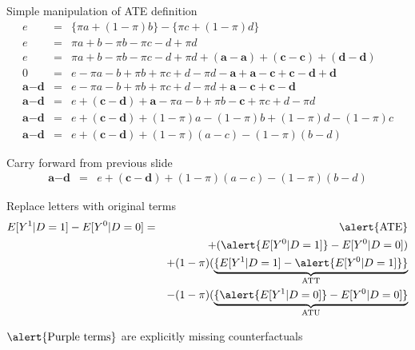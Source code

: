 \documentclass{beamer}
\begin{document}
\begin{frame}[plain]

  \begin{block}{Simple manipulation of ATE definition}
    \begin{eqnarray*}
      e&=&\{\pi{a} + (1-\pi)b\} - \{\pi{c} + (1-\pi)d\}  \\
      e&=&\pi{a} + b - \pi{b} - \pi{c} - d + \pi{d}  \\
      e&=&\pi{a} + b - \pi{b} - \pi{c} - d + \pi{d} + (\textbf{a} - \textbf{a}) + (\textbf{c} - \textbf{c}) + (\textbf{d} - \textbf{d})  \\
      0&=&e-\pi{a} - b + \pi{b} + \pi{c} + d - \pi{d} - \textbf{a} + \textbf{a} - \textbf{c} + \textbf{c} - \textbf{d} + \textbf{d}  \\
      \textbf{a}-\textbf{d}&=&e-\pi{a} - b + \pi{b} + \pi{c} + d - \pi{d}  + \textbf{a} - \textbf{c} + \textbf{c} - \textbf{d}  \\
      \textbf{a}-\textbf{d}&=&e  + (\textbf{c} - \textbf{d}) + \textbf{a}-\pi{a} - b + \pi{b} - \textbf{c} + \pi{c} + d - \pi{d} \\
      \textbf{a}-\textbf{d}&=&e  + (\textbf{c} - \textbf{d}) + (1-\pi)a -(1-\pi)b + (1-\pi)d - (1-\pi)c  \\
      \textbf{a}-\textbf{d}&=&e  + (\textbf{c} - \textbf{d}) + (1-\pi)(a-c) -(1-\pi)(b-d)
    \end{eqnarray*}
  \end{block}


\end{frame}

\begin{frame}[shrink=20,plain]
  \begin{block}{Carry forward from previous slide}
    \begin{eqnarray*}
      \textbf{a}-\textbf{d}&=&e  + (\textbf{c} - \textbf{d}) + (1-\pi)(a-c) -(1-\pi)(b-d)
    \end{eqnarray*}
  \end{block}

  \begin{block}{Replace letters with original terms }
    \begin{eqnarray*}
      E[Y^1|D=1] - E[Y^0|D=0] &=& \alert{\text{ATE}}  \\
      &&+ (\alert{E[Y^0|D=1]} - E[Y^0|D=0])  \\
      && + (1-\pi)( \underbrace{\{E[Y^1|D=1] - \alert{E[Y^0|D=1]}\}}_{ \mathclap{\text{ATT}}}  \\
      && - (1-\pi)( \underbrace{\{\alert{E[Y^1|D=0]} - {E[Y^0|D=0]}\}}_{ \mathclap{\text{ATU}}}  \\
    \end{eqnarray*}
  \end{block}
  
$\alert{\text{Purple terms}}$ are explicitly missing counterfactuals 
  
\end{frame}
\end{document}
